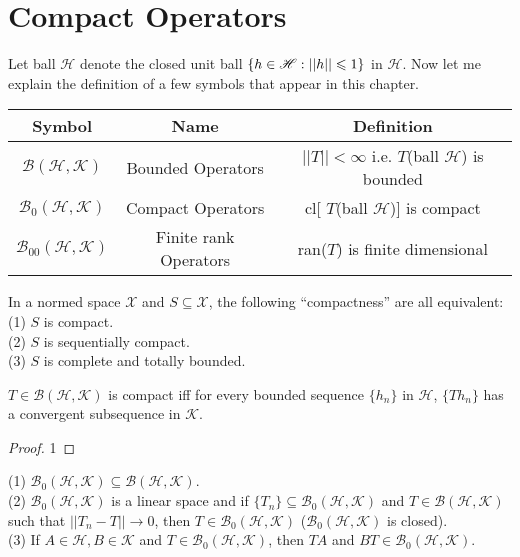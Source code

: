 \chapter{Compact Operators}\label{chp:2_4}

Let ball $\mathscr{H}$ denote the closed unit ball $\{h\in\mathscr{H}:||h||\leqslant 1\}$ 
in $\mathscr{H}$.
Now let me explain the definition of a few symbols that appear in this chapter.

\begin{tabular}{|c|c|c|}%
    \hline  %
    \textbf{Symbol}&\textbf{Name}&\textbf{Definition}\\
    \hline  %
    $\mathscr{B}(\mathscr{H},\mathscr{K})$&Bounded Operators&$||T||<\infty$ i.e. $T$(ball $\mathscr{H}$) is bounded\\
    \hline %
    $\mathscr{B}_0(\mathscr{H},\mathscr{K})$&Compact Operators& cl[ $T$(ball $\mathscr{H}$)] is compact\\
    \hline 
    $\mathscr{B}_{00}(\mathscr{H},\mathscr{K})$&Finite rank Operators& ran($T$) is finite dimensional\\
    \hline
\end{tabular}

\begin{proposition}{}{}
   In a normed space $\mathscr{X}$ and $S\subseteq \mathscr{X}$, the following
“compactness” are all equivalent:\\
(1) $S$ is compact.\\
(2) $S$ is sequentially compact. \\
(3) $S$ is complete and totally bounded.
\end{proposition}

\begin{proposition}{}{}
    $T\in\mathscr{B}(\mathscr{H},\mathscr{K})$ is compact iff for every bounded sequence $\{h_n\}$ in $\mathscr{H}$, 
    $\{T h_n\}$ has a convergent subsequence in $\mathscr{K}$.
\end{proposition}

\begin{proof}
    1
\end{proof}


\begin{proposition}{}{}
    (1) $\mathscr{B}_0(\mathscr{H},\mathscr{K})\subseteq \mathscr{B}(\mathscr{H},\mathscr{K})$.\\
    (2) $\mathscr{B}_0(\mathscr{H},\mathscr{K})$ is a linear space and if $\{T_n\}\subseteq \mathscr{B}_0(\mathscr{H},\mathscr{K})$ and $T\in\mathscr{B}(\mathscr{H},\mathscr{K})$
    such that $||T_n-T||\rightarrow 0$, then $T\in\mathscr{B}_0(\mathscr{H},\mathscr{K})$ ($\mathscr{B}_0(\mathscr{H},\mathscr{K})$ is closed).\\
    (3) If $A\in\mathscr{H},B\in\mathscr{K}$ and $T\in\mathscr{B}_0(\mathscr{H},\mathscr{K})$,
    then $TA$ and $BT\in\mathscr{B}_0(\mathscr{H},\mathscr{K})$.
\end{proposition}

